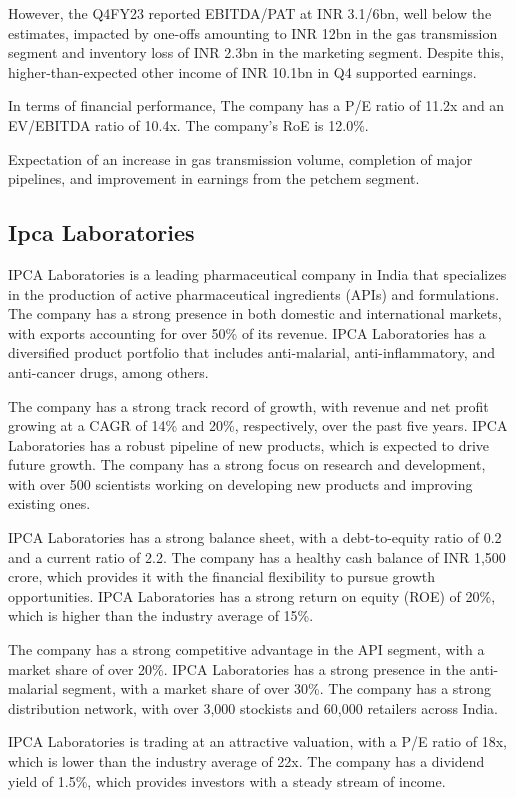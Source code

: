 However, the Q4FY23 reported EBITDA/PAT at INR 3.1/6bn, well below the estimates, impacted by one-offs amounting to INR 12bn in the gas transmission segment and inventory loss of INR 2.3bn in the marketing segment. Despite this, higher-than-expected other income of INR 10.1bn in Q4 supported earnings. 

In terms of financial performance, The company has a P/E ratio of 11.2x and an EV/EBITDA ratio of 10.4x. The company's RoE is 12.0\%.

Expectation of an increase in gas transmission volume, completion of major pipelines, and improvement in earnings from the petchem segment. 

    \subsection{Ipca Laboratories} IPCA Laboratories is a leading pharmaceutical company in India that specializes in the production of active pharmaceutical ingredients (APIs) and formulations. The company has a strong presence in both domestic and international markets, with exports accounting for over 50\% of its revenue. IPCA Laboratories has a diversified product portfolio that includes anti-malarial, anti-inflammatory, and anti-cancer drugs, among others.

The company has a strong track record of growth, with revenue and net profit growing at a CAGR of 14\% and 20\%, respectively, over the past five years. IPCA Laboratories has a robust pipeline of new products, which is expected to drive future growth. The company has a strong focus on research and development, with over 500 scientists working on developing new products and improving existing ones.

IPCA Laboratories has a strong balance sheet, with a debt-to-equity ratio of 0.2 and a current ratio of 2.2. The company has a healthy cash balance of INR 1,500 crore, which provides it with the financial flexibility to pursue growth opportunities. IPCA Laboratories has a strong return on equity (ROE) of 20\%, which is higher than the industry average of 15\%.

The company has a strong competitive advantage in the API segment, with a market share of over 20\%. IPCA Laboratories has a strong presence in the anti-malarial segment, with a market share of over 30\%. The company has a strong distribution network, with over 3,000 stockists and 60,000 retailers across India.

IPCA Laboratories is trading at an attractive valuation, with a P/E ratio of 18x, which is lower than the industry average of 22x. The company has a dividend yield of 1.5\%, which provides investors with a steady stream of income.

